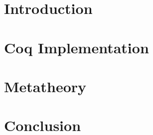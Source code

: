 \begin{abstract}

\end{abstract}

\maketitle

\section{Introduction}
\label{sec:intro}



\section{Coq Implementation}
\label{sec:coqimpl}


\section{Metatheory}
\label{sec:metatheory}


\section{Conclusion}
\label{sec:conclusion}

\setlength{\bibsep}{.8ex}


